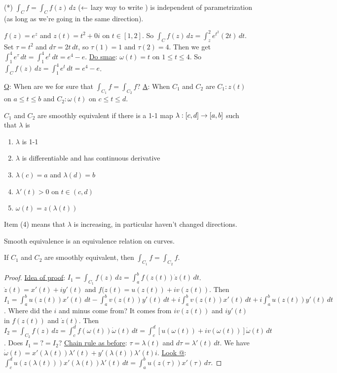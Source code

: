 \documentclass[]{article}
\begin{document}
(*) $\int_C f = \int_C f(z) \, dz$ ($\leftarrow$ lazy way to write ) is independent of parametrization (as long as we're going in the same direction).
\begin{example}
	$f(z) = e^z$ and $z(t) = t^2 + 0i$ on $t\in[1,2]$. So $\int_C f(z) \, dz = \int_z^2 e^{t^2}(2t)\, dt$. Set $\tau = t^2$ and $d\tau = 2t\, dt$, so $\tau(1) = 1$ and $\tau(2) = 4$. Then we get $\int_1^4 e^\tau \, dt = \int_1^4 e^t \, dt = e^4 - e$.
	\underline{Do smae}: $\omega(t) = t$ on $1\leq t \leq 4$. So $\int_C f(z) \, dz = \int_1^4 e^t\, dt = e^4 -e$.
\end{example}
\underline{Q}: When are we for sure that $\int_{C_1} f = \int_{C_2} f$? \underline{A}: When $C_1$ and $C_2$ are 
$C_1: z(t)$ on $a\leq t\leq b$ and $C_2: \omega(t)$ on $c\leq t \leq d$.
\begin{definition}
	$C_1$ and $C_2$ are smoothly equivalent if there is a 1-1 map $\lambda : [c,d] \rightarrow [a,b]$ such that $\lambda$ is 
	\begin{enumerate}
		\item $\lambda$ is 1-1
		\item $\lambda$ is differentiable and has continuous derivative
		\item $\lambda(c) = a$ and $\lambda(d) = b$
		\item $\lambda'(t)>0$ on $t\in(c,d)$
		\item $\omega(t) = z(\lambda(t))$
	\end{enumerate}
	Item (4) means that $\lambda $ is increasing, in particular haven't changed directions.
\end{definition}
\begin{example}
	 Smooth equivalence is an equivalence relation on curves.
\end{example}
\begin{proposition}
	If $C_1$ and $C_2$ are smoothly equivalent, then $\int_{C_1} f = \int_{C_2} f$.
\end{proposition}
\begin{proof}
	\underline{Idea of proof}: $I_1=\int_{C_1} f(z) \, dz = \int_a^b f(z(t))\dot{z}(t) \, dt$. $\dot{z}(t) = x'(t) + iy'(t)$ and $f(z(t) = u(z(t)) + iv(z(t))$. Then $I_1=\int_a^b u(z(t))x'(t)\, dt - \int_a^b v(z(t))y'(t)\, dt + i\int_a^b v(z(t))x'(t)\, dt + i\int_a^b u(z(t))y'(t) \, dt$. Where did the $i$ and minus come from? It comes from $iv(z(t))$ and $iy'(t)$ in $f(z(t))$ and $\dot{z}(t)$. Then $I_2 = \int_{C_2} f(z) \, dz = \int_c^d f(\omega(t))\dot{\omega}(t) \, dt = \int_c^d [u(\omega(t))+iv(\omega(t))]\dot{\omega}(t)\,dt$. Does $I_1 =?= I_2$?
	\underline{Chain rule as before}: $\tau = \lambda(t)$ and $d\tau = \lambda'(t)\, dt$. 
	We have $\dot{\omega}(t) = x'(\lambda(t))\lambda'(t) + y'(\lambda(t))\lambda'(t)i$.
	\underline{Look @}: $\int_c^d u(z(\lambda(t))) x'(\lambda(t)) \lambda'(t) \, dt = \int_a^b u(z(\tau))x'(\tau)\, d\tau$.
\end{proof}
\end{document}
